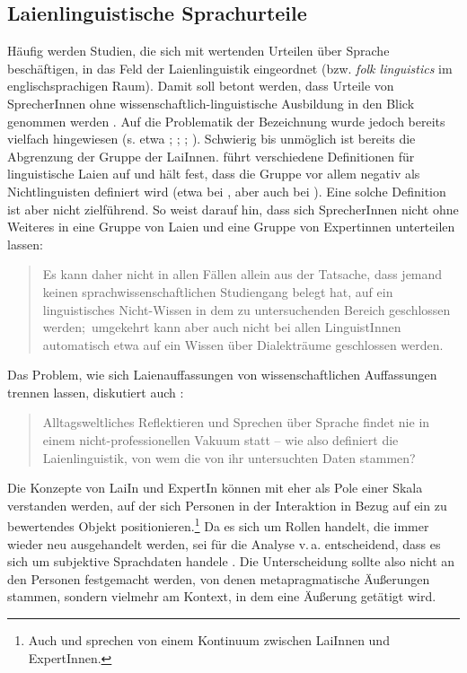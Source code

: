 \subsection{Laienlinguistische Sprachurteile}
\label{sec:Laienlinguistik}
Häufig werden Studien, die sich mit wertenden Urteilen über Sprache beschäftigen, in das Feld der Laienlinguistik eingeordnet (bzw. \textit{folk linguistics} im englischsprachigen Raum). 
Damit soll betont werden, dass Urteile von SprecherInnen ohne wissenschaftlich-linguistische Ausbildung in den Blick genommen werden \citep[s.][25--26]{Antos1996}. 
Auf die Problematik der Bezeichnung wurde jedoch bereits vielfach hingewiesen (s. etwa \citealp{Cuonz.2014}; \citealp{Konig.2014}; \citealp[396]{Moschonas2014}; \citealp[320]{Spitzmuller2014}). 
Schwierig bis unmöglich ist bereits die Abgrenzung der Gruppe der LaiInnen. 
\citet[11--12]{Konig.2014} f{\"u}hrt verschiedene Definitionen f{\"u}r linguistische Laien auf und h{\"a}lt fest, dass die Gruppe vor allem negativ als {\glqq}Nichtlinguisten{\grqq} definiert wird (etwa bei \citealp[179]{Garrett.2012}, aber auch bei \citealp[8]{Hennig2016}). 
Eine solche Definition ist aber nicht zielführend. 
So weist \citet{Konig.2014} darauf hin, dass sich SprecherInnen nicht ohne Weiteres in eine Gruppe von Laien und eine Gruppe von Expertinnen unterteilen lassen:
\begin{quote}Es kann daher nicht in allen F{\"a}llen allein aus der Tatsache, dass jemand keinen sprachwissenschaftlichen Studiengang belegt hat, auf ein linguistisches Nicht-Wissen in dem zu untersuchenden Bereich geschlossen werden;~umgekehrt kann aber auch nicht bei allen LinguistInnen automatisch etwa auf ein Wissen {\"u}ber Dialektr{\"a}ume geschlossen werden.~\citep[12--13]{Konig.2014}\end{quote}
Das Problem, wie sich Laienauffassungen von wissenschaftlichen Auffassungen trennen lassen, diskutiert auch \citeauthor{Cuonz.2014}:\begin{quote}Alltagsweltliches Reflektieren und Sprechen {\"u}ber Sprache findet nie in einem nicht-professionellen Vakuum statt -- wie also definiert die Laienlinguistik, von wem die von ihr untersuchten Daten stammen?~\citep[12--13]{Cuonz.2014}\end{quote}
Die Konzepte von LaiIn und ExpertIn k{\"o}nnen mit \citet[14--15]{Konig.2014} eher als Pole einer Skala verstanden werden, auf der sich Personen in der Interaktion in Bezug auf ein zu bewertendes Objekt positionieren.\footnote{Auch \citet[13]{Cuonz.2014} und \citet[320]{Spitzmuller2014} sprechen von einem Kontinuum zwischen LaiInnen und ExpertInnen.} 
Da es sich um Rollen handelt, die immer wieder neu ausgehandelt werden, sei f{\"u}r die Analyse v.\,a. entscheidend, dass es sich um {\glqq}subjektive Sprachdaten{\grqq} handele \citep[15]{Konig.2014}. 
Die Unterscheidung sollte also nicht an den Personen festgemacht werden, von denen metapragmatische Äußerungen stammen, sondern vielmehr am Kontext, in dem eine Äußerung getätigt wird. 

